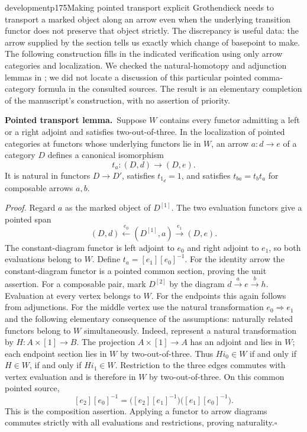 \begin{dcomment}{development}{p175}{Making pointed transport explicit}
Grothendieck needs to transport a marked object along an arrow even when the underlying transition functor does not preserve that object strictly. The discrepancy is useful data: the arrow supplied by the section tells us exactly which change of basepoint to make. The following construction fills in the indicated verification using only arrow categories and localization. We checked the natural-homotopy and adjunction lemmas in \citet[\S1.1, especially Proposition~1.1.9 and Corollary~1.1.10]{Cisinski2004Minimal}; we did not locate a discussion of this particular pointed comma-category formula in the consulted sources. The result is an elementary completion of the manuscript's construction, with no assertion of priority.

\textbf{Pointed transport lemma.}\ours\ Suppose $W$ contains every functor admitting a left or a right adjoint and satisfies two-out-of-three. In the localization of pointed categories at functors whose underlying functors lie in $W$, an arrow $a:d\to e$ of a category $D$ defines a canonical isomorphism
\[
 t_a:(D,d)\longrightarrow(D,e).
\]
It is natural in functors $D\to D'$, satisfies $t_{1_d}=1$, and satisfies $t_{ba}=t_bt_a$ for composable arrows $a,b$.

\textit{Proof.} Regard $a$ as the marked object of $D^{[1]}$. The two evaluation functors give a pointed span
\[
 (D,d)\xleftarrow{\ e_0\ }(D^{[1]},a)
 \xrightarrow{\ e_1\ }(D,e).
\]
The constant-diagram functor is left adjoint to $e_0$ and right adjoint to $e_1$, so both evaluations belong to $W$. Define $t_a=[e_1][e_0]^{-1}$. For the identity arrow the constant-diagram functor is a pointed common section, proving the unit assertion. For a composable pair, mark $D^{[2]}$ by the diagram $d\xrightarrow a e\xrightarrow b h$. Evaluation at every vertex belongs to $W$. For the endpoints this again follows from adjunctions. For the middle vertex use the natural transformation $e_0\Rightarrow e_1$ and the following elementary consequence of the assumptions: naturally related functors belong to $W$ simultaneously. Indeed, represent a natural transformation by $H:A\times[1]\to B$. The projection $A\times[1]\to A$ has an adjoint and lies in $W$; each endpoint section lies in $W$ by two-out-of-three. Thus $H i_0\in W$ if and only if $H\in W$, if and only if $H i_1\in W$. Restriction to the three edges commutes with vertex evaluation and is therefore in $W$ by two-out-of-three. On this common pointed source,
\[
 [e_2][e_0]^{-1}
 =\bigl([e_2][e_1]^{-1}\bigr)
  \bigl([e_1][e_0]^{-1}\bigr).
\]
This is the composition assertion. Applying a functor to arrow diagrams commutes strictly with all evaluations and restrictions, proving naturality.\hfill$\square$


\end{dcomment}
